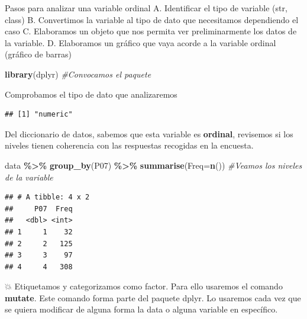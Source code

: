 \documentclass[
]{article}
\newenvironment{Shaded}{\begin{snugshade}}{\end{snugshade}}
\newcommand{\AttributeTok}[1]{\textcolor[rgb]{0.13,0.29,0.53}{#1}}
\newcommand{\CommentTok}[1]{\textcolor[rgb]{0.56,0.35,0.01}{\textit{#1}}}
\newcommand{\FunctionTok}[1]{\textcolor[rgb]{0.13,0.29,0.53}{\textbf{#1}}}
\newcommand{\NormalTok}[1]{#1}
\newcommand{\SpecialCharTok}[1]{\textcolor[rgb]{0.81,0.36,0.00}{\textbf{#1}}}
\begin{document}
Pasos para analizar una variable ordinal A. Identificar el tipo de
variable (str, class) B. Convertimos la variable al tipo de dato que
necesitamos dependiendo el caso C. Elaboramos un objeto que nos permita
ver preliminarmente los datos de la variable. D. Elaboramos un gráfico
que vaya acorde a la variable ordinal (gráfico de barras)

\begin{Shaded}
\begin{Highlighting}[]
\FunctionTok{library}\NormalTok{(dplyr) }\CommentTok{\#Convocamos el paquete}
\end{Highlighting}
\end{Shaded}

Comprobamos el tipo de dato que analizaremos

\begin{Shaded}
\end{Shaded}

\begin{verbatim}
## [1] "numeric"
\end{verbatim}

Del diccionario de datos, sabemos que esta variable es \textbf{ordinal},
revisemos si los niveles tienen coherencia con las respuestas recogidas
en la encuesta.

\begin{Shaded}
\begin{Highlighting}[]
\NormalTok{data }\SpecialCharTok{\%\textgreater{}\%}
 \FunctionTok{group\_by}\NormalTok{(P07) }\SpecialCharTok{\%\textgreater{}\%}
 \FunctionTok{summarise}\NormalTok{(}\AttributeTok{Freq=}\FunctionTok{n}\NormalTok{()) }\CommentTok{\#Veamos los niveles de la variable}
\end{Highlighting}
\end{Shaded}

\begin{verbatim}
## # A tibble: 4 x 2
##     P07  Freq
##   <dbl> <int>
## 1     1    32
## 2     2   125
## 3     3    97
## 4     4   308
\end{verbatim}

💥 Etiquetamos y categorizamos como factor. Para ello usaremos el
comando \textbf{mutate}. Este comando forma parte del paquete dplyr. Lo
usaremos cada vez que se quiera modificar de alguna forma la data o
alguna variable en específico.
\end{document}
